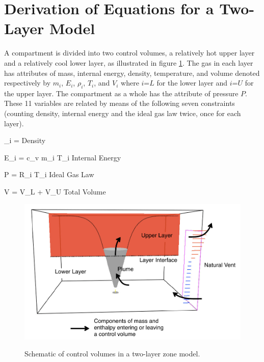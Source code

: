 \section{Derivation of Equations for a Two-Layer Model}

A compartment is divided into two control volumes, a relatively hot upper layer and a relatively cool lower layer, as illustrated in figure \ref{fig:Control_Volumes}.  The gas in each layer has attributes of mass, internal energy, density, temperature, and volume denoted respectively by $m_i$, $E_i$, $\rho_i$, $T_i$, and $V_i$ where $i$=$L$ for the lower layer and $i$=$U$ for the upper layer.  The compartment as a whole has the attribute of pressure $P$.  These 11 variables are related by means of the following seven constraints (counting density, internal energy and the ideal gas law twice, once for each layer).

\be \rho _i  =  {\hspace{1.0in} \textnormal{Density}} \label{eq:density} \ee

\be  E_i = c_v m_i T_i {\hspace{1.0in} \textnormal{Internal Energy}} \label{eq:internal_energy} \ee

\be P = R\rho _i T_i {\hspace{1.0in} \textnormal{Ideal Gas Law}} \ee

\be V = V_L + V_U {\hspace{1.0in} \textnormal{Total Volume}} \label{eq:volume} \ee

\begin{figure}[h]
\begin{center}
\includegraphics[width=5.0in]{FIGURES/Theory/Control_Volumes}\\
\end{center}
\caption{Schematic of control volumes in a two-layer zone model.}
 \label{fig:Control_Volumes}
\end{figure}

